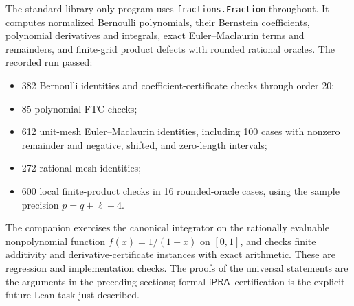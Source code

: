 \documentclass[11pt]{article}
\theoremstyle{definition}
\newcommand{\ipra}{\ensuremath{\mathsf{iPRA}}}
\newcommand{\code}[1]{\texttt{#1}}
\begin{document}
The standard-library-only program  uses
\code{fractions.Fraction} throughout.  It computes normalized Bernoulli
polynomials, their Bernstein coefficients, polynomial derivatives and
integrals, exact Euler--Maclaurin terms and remainders, and finite-grid
product defects with rounded rational oracles.  The recorded run passed:
\begin{itemize}
\item 382 Bernoulli identities and coefficient-certificate checks
through order 20;
\item 85 polynomial FTC checks;
\item 612 unit-mesh Euler--Maclaurin identities, including 100 cases
with nonzero remainder and negative, shifted, and zero-length intervals;
\item 272 rational-mesh identities;
\item 600 local finite-product checks in 16 rounded-oracle cases,
using the sample precision \(p=q+\ell+4\).
\end{itemize}
The companion  exercises the canonical
integrator on the rationally evaluable nonpolynomial function
\(f(x)=1/(1+x)\) on \([0,1]\), and checks finite additivity and
derivative-certificate instances with exact arithmetic.
These are regression and implementation checks.  The proofs of the
universal statements are the arguments in the preceding sections;
formal \ipra\ certification is the explicit future Lean task just
described.
\end{document}

